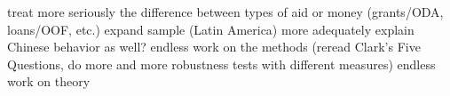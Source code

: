 treat more seriously the difference between types of aid or money (grants/ODA, loans/OOF, etc.)
expand sample (Latin America)
more adequately explain Chinese behavior as well?
endless work on the methods (reread Clark's Five Questions, do more and more robustness tests with different measures)
endless work on theory